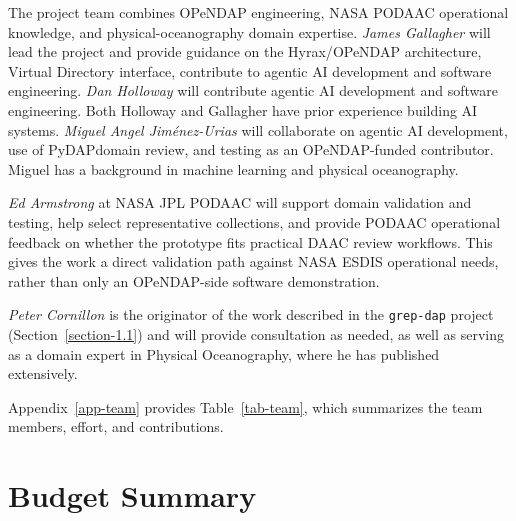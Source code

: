 \documentclass[11pt]{article}
\begin{document}
The project team combines \acs{OPeNDAP} engineering, NASA \ac{PODAAC}
operational knowledge, and physical-oceanography domain expertise. {\em James
Gallagher} will lead the project and provide guidance on the Hyrax/\acs{OPeNDAP} architecture, Virtual Directory
interface, contribute to agentic \ac{AI} development and
software engineering. {\em Dan Holloway} will contribute agentic \acs{AI}
development and software engineering. Both Holloway and Gallagher have prior
experience building \ac{AI} systems. {\em Miguel Angel Jim\'{e}nez-Urias} will
collaborate on agentic \acs{AI} development, use of \ac{PyDAP}domain review, and testing as an
\acs{OPeNDAP}-funded contributor. Miguel has a background in machine learning
and physical oceanography.

{\em Ed Armstrong} at NASA
\ac{JPL} \acs{PODAAC} will support domain validation and testing, help select
representative collections, and provide \acs{PODAAC} operational feedback on
whether the prototype fits practical \ac{DAAC} review workflows. This gives the
work a direct validation path against NASA \acs{ESDIS} operational needs, rather
than only an \acs{OPeNDAP}-side software demonstration.

{\em Peter Cornillon} is the originator of the work described in the
\texttt{grep-dap} project (Section~\ref{section-1.1}) and will provide
consultation as needed, as well as serving as a domain expert in Physical
Oceanography, where he has published extensively.

Appendix~\ref{app-team} provides Table~\ref{tab-team}, which summarizes the team
members, effort, and contributions.


\section{Budget Summary}
\label{section-budget}
\end{document}
